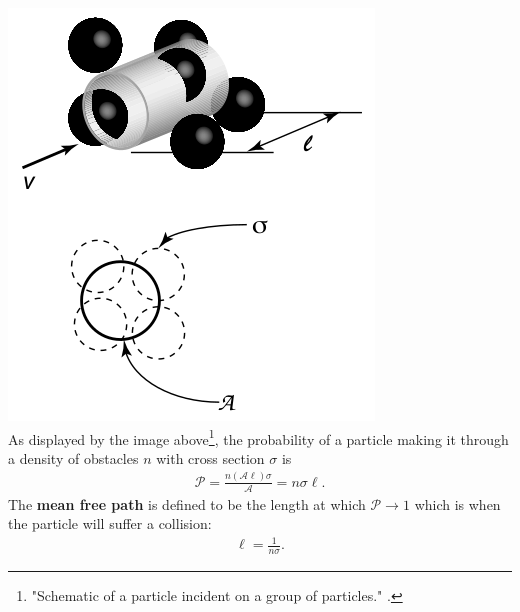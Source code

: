 \begin{multicols}{2}
{\centering\includegraphics[width=0.8\columnwidth]{./Images/Diagrams/meanfreepath.png}}\\
As displayed by the image above\footnote{"Schematic of a particle incident on a group of particles." \cite{bib:AST304}.}, the probability of a particle making it through a density of obstacles $n$ with cross section $\sigma$ is
\begin{align}
	\mathcal{P} = \frac{n(\mathcal{A}\ell)\sigma}{\mathcal{A}} = n\sigma \ell.
\end{align}
The \textbf{mean free path} is defined to be the length at which $\mathcal{P}\rightarrow 1$ which is when the particle will suffer a collision:
\begin{align}
\ell = \frac{1}{n\sigma}.
\end{align}



\end{multicols}
